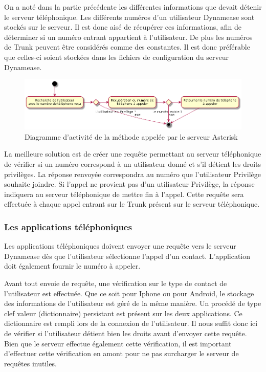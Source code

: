 On a noté dans la partie précédente les différentes informations que devait détenir le serveur téléphonique. Les différents numéros d'un utilisateur Dynamease sont stockés sur le serveur. Il est donc aisé de récupérer ces informations, afin de déterminer si un numéro entrant appartient à l'utilisateur. De plus les numéros de Trunk peuvent être considérés comme des constantes. Il est donc préférable que celles-ci soient stockées dans les fichiers de configuration du serveur Dynamease. 
\newpage
\begin{figure}[!h]
	\centering
	\includegraphics[scale=0.5]{img/activity_rewrite_ast.png}
	\caption{\label{activity_rewrite_ast} Diagramme d'activité de la méthode appelée par le serveur Asterisk}
\end{figure}


La meilleure solution est de créer une requête permettant au serveur téléphonique de vérifier si un numéro correspond à un utilisateur donné et s'il détient les droits privilèges. La réponse renvoyée correspondra au numéro que l'utilisateur Privilège souhaite joindre. Si l'appel ne provient pas d'un utilisateur Privilège, la réponse indiquera au serveur téléphonique de mettre fin à l'appel. Cette requête sera effectuée à chaque appel entrant sur le Trunk présent sur le serveur téléphonique.

\subsubsection{Les applications téléphoniques}

Les applications téléphoniques doivent envoyer une requête vers le serveur Dynamease dès que l'utilisateur sélectionne l'appel d'un contact. L'application doit également fournir le numéro à appeler.

Avant tout envoie de requête, une vérification sur le type de contact de l'utilisateur est effectuée. Que ce soit pour Iphone ou pour Android, le stockage des informations de l'utilisateur est géré de la même manière. Un procédé de type clef valeur (dictionnaire) persistant est présent sur les deux applications. Ce dictionnaire est rempli lors de la connexion de l'utilisateur. Il nous suffit donc ici de vérifier si l'utilisateur détient bien les droits avant d'envoyer cette requête. Bien que le serveur effectue également cette vérification, il est important d'effectuer cette vérification en amont pour ne pas surcharger le serveur de requêtes inutiles.\\

